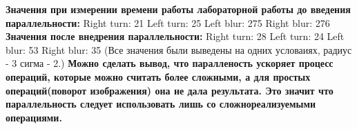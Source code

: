 {\bfseries{Значения при измерении времени работы лабораторной работы до введения параллельности\+:}} Right turn\+: 21 Left turn\+: 25 Left blur\+: 275 Right blur\+: 276 {\bfseries{Значения после внедрения параллельности\+:}} Right turn\+: 28 Left turn\+: 24 Left blur\+: 53 Right blur\+: 35 (Все значения были выведены на одних условаиях, радиус -\/ 3 сигма -\/ 2.) {\bfseries{Можно сделать вывод, что паралленость ускоряет процесс операций, которые можно считать более сложными, а для простых операций(поворот изображения) она не дала результата. Это значит что параллельность следует использовать лишь со сложнореализуемыми операциями.}} 